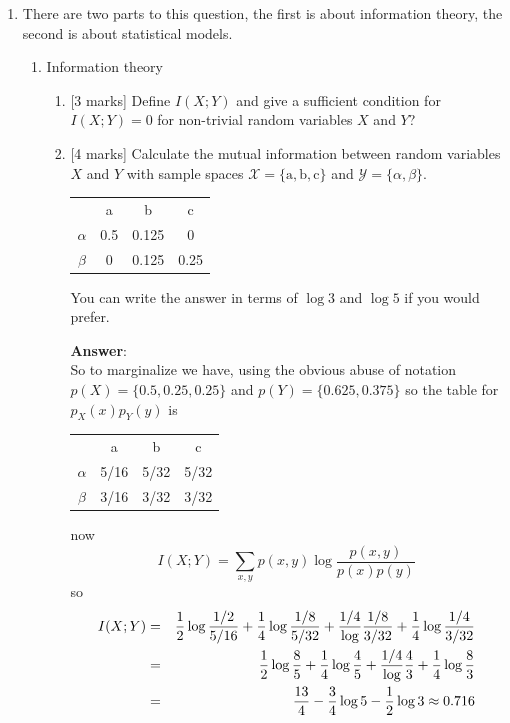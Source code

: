 \documentclass{article}
\newif\ifanswer
\begin{document}
\begin{enumerate}
\item There are two parts to this question, the first is about information theory, the second is about statistical models.
  \begin{enumerate}
  \item{Information theory}
\begin{enumerate}
\item{}[3 marks] Define $I(X;Y)$ and give a sufficient condition for $I(X;Y)=0$ for non-trivial random variables $X$ and $Y$?
  \ifanswer \textbf{Answer}:\\
  \begin{equation}
  I(X;Y)=\sum_{x,y}p(x,y)\log{\frac{p(x,y)}{p(x)p(y)}}
  \end{equation}
  and this is zero if the argument of the log is zero, that is $p(x,y)=p(x)p(y)$ for all $x$ and $y$, that is when $X$ and $Y$ are independent.
  \fi
\item{}[4 marks]
 Calculate the mutual information between random variables $X$ and $Y$ with sample spaces $\mathcal{X}=\{\mbox{a},\mbox{b},\mbox{c}\}$ and $\mathcal{Y}=\{\alpha,\beta\}$.
  \begin{center}
  \begin{tabular}{c|ccc}
    \hline
    &\mbox{a}&\mbox{b}&\mbox{c}\\
    $\alpha$&0.5&0.125&0\\
    $\beta$&0&0.125&0.25
    \end{tabular}
  \end{center}
You can write the answer in terms of $\log{3}$ and $\log{5}$ if you would prefer.
  
  \ifanswer \textbf{Answer}:\\
So to marginalize we have, using the obvious abuse of notation $p(X)=\{0.5,0.25,0.25\}$ and $p(Y)=\{0.625,0.375\}$ so the table for $p_X(x)p_Y(y)$ is
  \begin{center}
  \begin{tabular}{c|ccc}
    \hline
    &\mbox{a}&\mbox{b}&\mbox{c}\\
    $\alpha$&5/16&5/32&5/32\\
    $\beta$&3/16&3/32&3/32
    \end{tabular}
  \end{center}
  now
  \begin{equation}
    I(X;Y)=\sum_{x,y}p(x,y)\log{\frac{p(x,y)}{p(x)p(y)}}
  \end{equation}
  so
  \begin{eqnarray}
    I(X;Y)&=&\frac{1}{2}\log{\frac{1/2}{5/16}}+\frac{1}{4}\log{\frac{1/8}{5/32}}+\frac{1/4}\log{\frac{1/8}{3/32}}+\frac{1}{4}\log{\frac{1/4}{3/32}}\cr
    &=&\frac{1}{2}\log{\frac{8}{5}}+\frac{1}{4}\log{\frac{4}{5}}+\frac{1/4}\log{\frac{4}{3}}+\frac{1}{4}\log{\frac{8}{3}}\cr
    &=&\frac{13}{4}-\frac{3}{4}\log{5}-\frac{1}{2}\log{3}\approx 0.716
  \end{eqnarray}


\end{enumerate}
\end{enumerate}
\end{enumerate}
\end{document}
